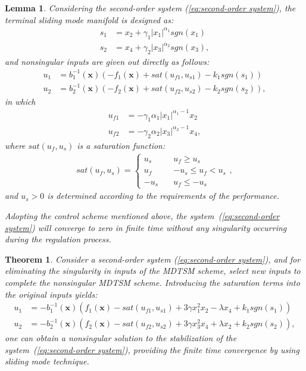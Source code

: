 \documentclass[3p]{elsarticle}
\theoremstyle{plain}
\newtheorem{mylem}{Lemma}
\newtheorem{mythm}{Theorem}
\theoremstyle{remark}
\begin{document}
\begin{mylem}\label{lemma:3}
Considering the second-order system (\ref{eq:second-order system}), the terminal sliding mode manifold is designed as:
\begin{align*}
s_1 &= x_2+\gamma_1\vert x_1\vert^{\alpha_1}sgn(x_1)\\
s_2 &= x_4+\gamma_2\vert x_3\vert^{\alpha_2}sgn(x_3),
\end{align*}
and nonsingular inputs are given out directly as follows:
\begin{align*}
u_1 &= b^{-1}_1(\bm x)(-f_1(\bm x)+sat(u_{f1},u_{s1})-k_1sgn(s_1))\\
u_2 &= b^{-1}_2(\bm x)(-f_2(\bm x)+sat(u_{f2},u_{s2})-k_2sgn(s_2)),
\end{align*}
in which
\begin{align*}
u_{f1}&=-\gamma_1\alpha_1\vert x_1\vert^{\alpha_1-1}x_2\\
u_{f2}&=-\gamma_2\alpha_2\vert x_3\vert^{\alpha_2-1}x_4,
\end{align*}
where $sat(u_f,u_s)$ is a saturation function:
\begin{align}
sat(u_f,u_s)=
\begin{cases}
u_s\quad &u_f\ge u_s\\
u_f\quad &-u_s\le u_f< u_s\\
-u_s\quad &u_f\le -u_s
\end{cases},
\end{align}
and $u_s>0$ is determined according to the requirements of the performance.\par
Adopting the control scheme mentioned above, the system~(\ref{eq:second-order system}) will converge to zero in finite time without any singularity occurring during the regulation process.
\end{mylem}
\begin{mythm}\label{theorem:3}
Consider a second-order system (\ref{eq:second-order system}), and for eliminating the singularity in inputs of the MDTSM scheme, select new inputs to complete the nonsingular MDTSM scheme. Introducing the saturation terms into the original inputs yields:
\begin{align}
u_1 &= -b_1^{-1}(\bm x)(f_1(\bm x)-sat(u_{f1},u_{s1})+3\gamma x_1^2x_2-\lambda x_4+k_1sgn(s_1))\\
u_2 &= -b_2^{-1}(\bm x)(f_2(\bm x)-sat(u_{f2},u_{s2})+3\gamma x_3^2x_4+\lambda x_2+k_2sgn(s_2)),\label{eq:nonsingular modified input}
\end{align}
one can obtain a nonsingular solution to the stabilization of the system~(\ref{eq:second-order system}), providing the finite time convergence by using sliding mode technique.
\end{mythm}
\end{document}
